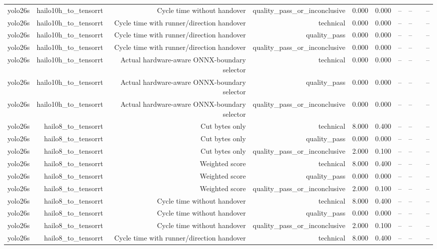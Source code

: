 \begin{table}[t]
\begin{tabular}{lrrrrrrrrr}
yolo26s & hailo10h\_to\_tensorrt & Cycle time without handover & quality\_pass\_or\_inconclusive & 0.000 & 0.000 & -- & -- &  & -- \\
yolo26s & hailo10h\_to\_tensorrt & Cycle time with runner/direction handover & technical & 0.000 & 0.000 & -- & -- &  & -- \\
yolo26s & hailo10h\_to\_tensorrt & Cycle time with runner/direction handover & quality\_pass & 0.000 & 0.000 & -- & -- &  & -- \\
yolo26s & hailo10h\_to\_tensorrt & Cycle time with runner/direction handover & quality\_pass\_or\_inconclusive & 0.000 & 0.000 & -- & -- &  & -- \\
yolo26s & hailo10h\_to\_tensorrt & Actual hardware-aware ONNX-boundary selector & technical & 0.000 & 0.000 & -- & -- &  & -- \\
yolo26s & hailo10h\_to\_tensorrt & Actual hardware-aware ONNX-boundary selector & quality\_pass & 0.000 & 0.000 & -- & -- &  & -- \\
yolo26s & hailo10h\_to\_tensorrt & Actual hardware-aware ONNX-boundary selector & quality\_pass\_or\_inconclusive & 0.000 & 0.000 & -- & -- &  & -- \\
yolo26s & hailo8\_to\_tensorrt & Cut bytes only & technical & 8.000 & 0.400 & -- & -- &  & -- \\
yolo26s & hailo8\_to\_tensorrt & Cut bytes only & quality\_pass & 0.000 & 0.000 & -- & -- &  & -- \\
yolo26s & hailo8\_to\_tensorrt & Cut bytes only & quality\_pass\_or\_inconclusive & 2.000 & 0.100 & -- & -- &  & -- \\
yolo26s & hailo8\_to\_tensorrt & Weighted score & technical & 8.000 & 0.400 & -- & -- &  & -- \\
yolo26s & hailo8\_to\_tensorrt & Weighted score & quality\_pass & 0.000 & 0.000 & -- & -- &  & -- \\
yolo26s & hailo8\_to\_tensorrt & Weighted score & quality\_pass\_or\_inconclusive & 2.000 & 0.100 & -- & -- &  & -- \\
yolo26s & hailo8\_to\_tensorrt & Cycle time without handover & technical & 8.000 & 0.400 & -- & -- &  & -- \\
yolo26s & hailo8\_to\_tensorrt & Cycle time without handover & quality\_pass & 0.000 & 0.000 & -- & -- &  & -- \\
yolo26s & hailo8\_to\_tensorrt & Cycle time without handover & quality\_pass\_or\_inconclusive & 2.000 & 0.100 & -- & -- &  & -- \\
yolo26s & hailo8\_to\_tensorrt & Cycle time with runner/direction handover & technical & 8.000 & 0.400 & -- & -- &  & -- \\

\end{tabular}
\end{table}
